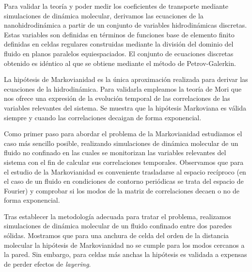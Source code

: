 \documentclass[b5paper,openright,10pt]{book}
\begin{document}
Para validar la teoría y poder medir los coeficientes de transporte mediante simulaciones de dinámica molecular, derivamos las ecuaciones de la nanohidrodinámica a partir de un conjunto de variables hidrodinámicas discretas. Estas variables son definidas en términos de funciones base de elemento finito definidas en celdas regulares construidas mediante la división del dominio del fluido en planos paralelos equiespaciados. El conjunto de ecuaciones discretas obtenido es idéntico al que se obtiene mediante el método de Petrov-Galerkin.

La hipótesis de Markovianidad es la única aproximación realizada para derivar las ecuaciones de la hidrodinámica. Para validarla empleamos la teoría de Mori que nos ofrece una expresión de la evolución temporal de las correlaciones de las variables relevantes del sistema. Se muestra que la hipótesis Markoviana es válida siempre y cuando las correlaciones decaigan de forma exponencial.

Como primer paso para abordar el problema de la Markovianidad estudiamos el caso más sencillo posible, realizando simulaciones de dinámica molecular de un fluido no confinado en las cuales se monitorizan las variables relevantes del sistema con el fin de calcular sus correlaciones temporales. 
Observamos que para el estudio de la Markovianidad es conveniente trasladarse al espacio recíproco (en el caso de un fluido en condiciones de contorno periódicas se trata del espacio de Fourier) y comprobar si los modos de la matriz de correlaciones decaen o no de forma exponencial. 

Tras establecer la metodología adecuada para tratar el problema, realizamos simulaciones de dinámica molecular de un fluido confinado entre dos paredes sólidas. Mostramos que para una anchura de celda del orden de la distancia molecular la hipótesis de Markovianidad no se cumple para los modos cercanos a la pared. Sin embargo, para celdas más anchas la hipótesis es validada a expensas de perder efectos de \textit{layering}. 
\end{document}
